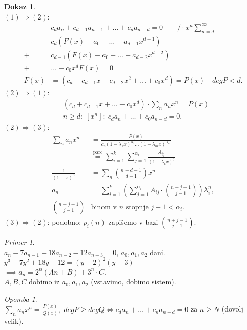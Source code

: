 \documentclass[a4paper, 12pt]{book}
\theoremstyle{definition}
\newtheorem{pro}[counter]{Dokaz}
\theoremstyle{remark}
\newtheorem*{ex}{Primer}
\newtheorem*{rem}{Opomba}
\begin{document}
\begin{pro} \text{} \\
  $(1) \Longrightarrow (2)$:
  \begin{align*}
    &c_d a_n + c_{d-1} a_{n-1} + \dots + c_n a_{n-d} = 0 \qquad / \cdot x^n \sum_{n=d}^{\infty} \\
    &c_d (F(x) - a_0 - \dots - a_{d-1} x^{d-1}) \\
    +& c_{d-1} (F(x) - a_0 - \dots - a_{d-2} x^{d-2}) \\
    +& \dots + c_0 x^d F(x) = 0 \\
    F(x) &= (c_d + c_{d-1} x + c_{d-2} x^2 + \dots + c_0 x^d) = P(x) \quad deg P < d.
  \end{align*}
  $(2) \Longrightarrow (1)$:
  \begin{align*}
    &(c_d + c_{d-1} x + \dots + c_0 x^d) \cdot \sum_n a_n x^n = P(x) \\
    &n \geq d: \; [x^n]: \; c_d a_n + \dots + c_0 a_{n-d} = 0.
  \end{align*}
  $(2) \Longrightarrow (3)$:
  \begin{align*}
    \sum_n a_n x^n &= \frac{P(x)}{c_d (1-\lambda_1 x)^{\alpha_1} \dots (1-\lambda_m x)^{\lambda_m}} \\
    &\stackrel{\text{parc}}{=} \sum_{i=1}^{k} \sum_{j=1}^{\alpha_i} \frac{A_{ij}}{(1-\lambda_i x)^{j}} \\
    \frac{1}{(1-x)^d} &= \sum_n \binom{n+d-1}{d-1} x^n \\
    a_n &= \sum_{i=1}^{k} \left(\sum_{j=1}^{\alpha_i} A_{ij} \cdot \binom{n+j-1}{j-1}\right) \lambda_i^n, \\
    \binom{n+j-1}{j-1} &\text{binom v $n$ stopnje } j-1 < \alpha_i.
  \end{align*}
  $(3) \Longrightarrow (2)$: podobno: $p_i(n)$ zapišemo v bazi $\binom{n+j-1}{j-1}$.
\end{pro}
\begin{ex} \text{} \\
  $a_n - 7 a_{n-1} + 18 a_{n-2} - 12 a_{n-3} = 0$, $a_0, a_1, a_2$ dani. \\
  $y^3 - 7 y^2 + 18 y - 12 = (y-2)^2 (y-3)$ \\
  $\implies a_n = 2^n (An + B) + 3^n \cdot C$. \\
  $A,B,C$ dobimo iz $a_0, a_1, a_2$ (vstavimo, dobimo sistem).
\end{ex}
\begin{rem} \text{} \\
  $\sum_n a_n x^n = \frac{P(x)}{Q(x)}, \; deg P \geq deg Q \iff c_d a_n + \dots + c_n a_{n-d} = 0$ za $n \geq N$ (dovolj velik).
\end{rem}
\end{document}
